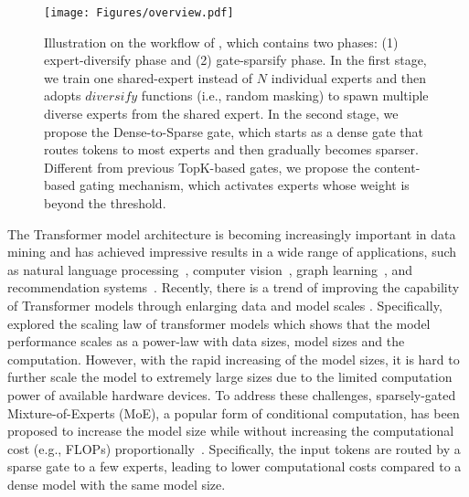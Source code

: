 \begin{figure*}[t]
    \centering
    \texttt{[image: Figures/overview.pdf]}
    \caption{Illustration on the workflow of \ourmethods{}, which contains two phases: (1) expert-diversify phase and (2) gate-sparsify phase. In the first stage, we train one shared-expert instead of $N$ individual experts and then adopts $diversify$ functions (i.e., random masking) to spawn multiple diverse experts from the shared expert. In the second stage, we propose the Dense-to-Sparse gate, which starts as a dense gate that routes tokens to most experts and then gradually becomes sparser. Different from previous TopK-based gates, we propose the content-based gating mechanism, which activates experts whose weight is beyond the threshold.} 
    \label{fig:overview}
\end{figure*}

The Transformer model architecture is becoming increasingly important in data mining and has achieved impressive results in a wide range of applications, such as natural language processing~\cite{DBLP:conf/nips/gpt3}, computer vision~\cite{DBLP:ViT}, graph learning~\cite{graphormer}, and recommendation systems~\cite{chen2019behavior}. Recently, there is a trend of improving the capability of Transformer models through enlarging data and model scales \citep{DBLP:conf/nips/gpt3}. Specifically, \cite{DBLP:scaling_laws} explored the scaling law of transformer models which shows that the model performance scales as a power-law with data sizes, model sizes and the computation. However, with the rapid increasing of the model sizes, it is hard to further scale the model to extremely large sizes due to the limited computation power of available hardware devices.
To address these challenges, sparsely-gated Mixture-of-Experts (MoE), a popular form of conditional computation, has been proposed to increase the model size while without increasing the computational cost (e.g., FLOPs) proportionally~\citep{DBLP:journals/corr/BengioLC13, DBLP:lstm_moe, DBLP:switch, DBLP:gshard, lewis2021base, roller2021hash}. 
Specifically, the input tokens are routed by a sparse gate to a few experts, leading to lower computational costs compared to a dense model with the same model size.


